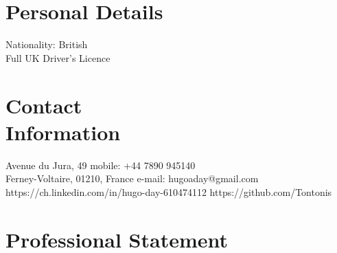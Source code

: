 \documentclass[margin,line]{resume}
\begin{document}
\begin{resume}

    \section{\mysidestyle Personal Details}
    Nationality: British \vspace{0mm}\\\vspace{-4.5mm}%
    Full UK Driver's Licence  \vspace{0mm}\\\vspace{-4.5mm}%


    \section{\mysidestyle Contact\\Information}
    Avenue du Jura, 49                            \hfill mobile: +44 7890 945140          \vspace{0mm}\\\vspace{0mm}%
    Ferney-Voltaire, 01210, France                          \hfill e-mail: hugoaday@gmail.com  \vspace{0mm}\\\vspace{-4.5mm} %
    https://ch.linkedin.com/in/hugo-day-610474112    \hfill https://github.com/Tontonis  \vspace{0mm}\\\vspace{-4.5mm}%

%
   \section{\mysidestyle Professional Statement}


\end{resume}
\end{document}
